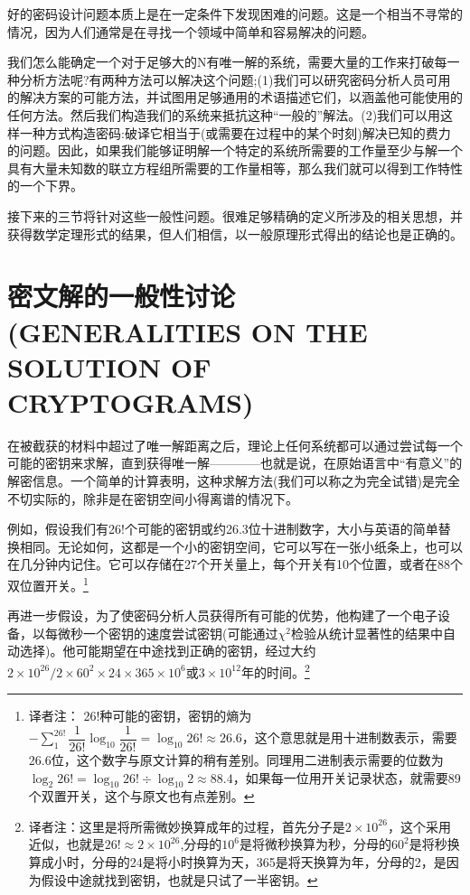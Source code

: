 \documentclass[]{article}
\begin{document}
好的密码设计问题本质上是在一定条件下发现困难的问题。这是一个相当不寻常的情况，因为人们通常是在寻找一个领域中简单和容易解决的问题。

我们怎么能确定一个对于足够大的N有唯一解的系统，需要大量的工作来打破每一种分析方法呢?有两种方法可以解决这个问题;(1)我们可以研究密码分析人员可用的解决方案的可能方法，并试图用足够通用的术语描述它们，以涵盖他可能使用的任何方法。然后我们构造我们的系统来抵抗这种“一般的”解法。(2)我们可以用这样一种方式构造密码:破译它相当于(或需要在过程中的某个时刻)解决已知的费力的问题。因此，如果我们能够证明解一个特定的系统所需要的工作量至少与解一个具有大量未知数的联立方程组所需要的工作量相等，那么我们就可以得到工作特性的一个下界。

接下来的三节将针对这些一般性问题。很难足够精确的定义所涉及的相关思想，并获得数学定理形式的结果，但人们相信，以一般原理形式得出的结论也是正确的。

\newpage
%   
%

\section{密文解的一般性讨论(GENERALITIES ON THE SOLUTION OF CRYPTOGRAMS)}

在被截获的材料中超过了唯一解距离之后，理论上任何系统都可以通过尝试每一个可能的密钥来求解，直到获得唯一解————也就是说，在原始语言中“有意义”的解密信息。一个简单的计算表明，这种求解方法(我们可以称之为完全试错)是完全不切实际的，除非是在密钥空间小得离谱的情况下。

例如，假设我们有26!个可能的密钥或约26.3位十进制数字，大小与英语的简单替换相同。无论如何，这都是一个小的密钥空间，它可以写在一张小纸条上，也可以在几分钟内记住。它可以存储在27个开关量上，每个开关有10个位置，或者在88个双位置开关。\footnote{译者注：
26!种可能的密钥，密钥的熵为$-\sum_{1}^{26!}{\dfrac{1}{26!}\log_{10}{\dfrac{1}{26!}}}=\log_10{26!}\approx 26.6$，这个意思就是用十进制数表示，需要26.6位，这个数字与原文计算的稍有差别。同理用二进制表示需要的位数为$\log_2{26!}=\log_{10}{26!}\div \log_{10}{2}\approx 88.4$，如果每一位用开关记录状态，就需要89个双置开关，这个与原文也有点差别。
}

再进一步假设，为了使密码分析人员获得所有可能的优势，他构建了一个电子设备，以每微秒一个密钥的速度尝试密钥(可能通过$\chi^2$检验从统计显著性的结果中自动选择)。他可能期望在中途找到正确的密钥，经过大约$2\times 10^{26}/2\times 60^2\times 24\times 365\times 10^6$或$3\times 10^{12}$年的时间。\footnote{译者注：这里是将所需微妙换算成年的过程，首先分子是$2\times 10^{26}$，这个采用近似，也就是$26!\approx 2\times 10^{26}$,分母的$10^6$是将微秒换算为秒，分母的$60^2$是将秒换算成小时，分母的24是将小时换算为天，365是将天换算为年，分母的2，是因为假设中途就找到密钥，也就是只试了一半密钥。}
\end{document}
